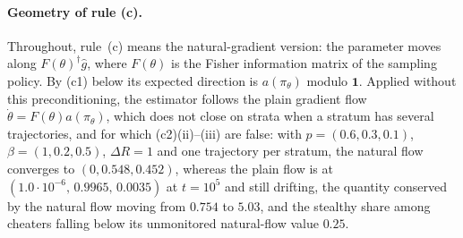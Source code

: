 \paragraph{Geometry of rule (c).} Throughout, rule~(c) means the natural-gradient version: the parameter moves along $F(\theta)^{\dagger}\hat g$, where $F(\theta)$ is the Fisher information matrix of the sampling policy. By (c1) below its expected direction is $a(\pi_\theta)$ modulo $\mathbf 1$. Applied without this preconditioning, the estimator follows the plain gradient flow $\dot\theta=F(\theta)a(\pi_\theta)$, which does not close on strata when a stratum has several trajectories, and for which (c2)(ii)--(iii) are false: with $p=(0.6,0.3,0.1)$, $\beta=(1,0.2,0.5)$, $\Delta R=1$ and one trajectory per stratum, the natural flow converges to $(0,0.548,0.452)$, whereas the plain flow is at $(1.0\cdot10^{-6},\,0.9965,\,0.0035)$ at $t=10^{5}$ and still drifting, the quantity conserved by the natural flow moving from $0.754$ to $5.03$, and the stealthy share among cheaters falling below its unmonitored natural-flow value $0.25$.

